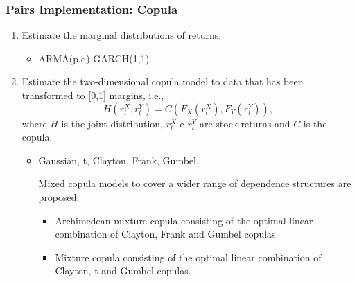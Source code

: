 \documentclass[pdf,10pt,xcolor=dvipsnames,hide notes]{beamer}
\begin{document}
	
\begin{frame}[label=frame4h]
	\frametitle{Pairs Implementation: Copula}
	
	
	\begin{enumerate}[(1)]
		\justifying
		
		\item  Estimate the marginal distributions of returns.
		\vspace{0.3cm}
		
		
		\begin{itemize}	
			\item ARMA(p,q)-GARCH(1,1).
		\end{itemize}
		
		\vspace{0.3cm}
		
		\pause
		\item Estimate the two-dimensional copula model to data that has been transformed to [0,1] margins, i.e.,
		\[
		H\left( r_{t}^{X},r_{t}^{Y}\right) =C\left(F_{X}\left( r_{t}^{X}\right)
		,F_{Y}\left( r_{t}^{Y}\right) \right) , 
		\]%
		where $H$ is the joint distribution, $r_{t}^{X}$ e $r_{t}^{Y}$ are stock
		returns and $C$ is the copula.
		
		\vspace{0.3cm}
		
		\pause
		
		\begin{itemize}	
			\item Gaussian, t, Clayton, Frank, Gumbel.
			
			\pause
			\vspace{0.3cm}
			
			\begin{exampleblock}
				\centering		
				Mixed copula models to cover a wider range of dependence structures are proposed.
			\end{exampleblock}
			
			\begin{itemize}
				\item Archimedean mixture copula consisting of the optimal linear combination of Clayton, Frank and Gumbel copulas.
				\item Mixture copula consisting of the optimal linear combination of Clayton, t and Gumbel copulas.
			\end{itemize}
			
		\end{itemize}
		
		\end{enumerate}
	\end{frame}
\end{document}
